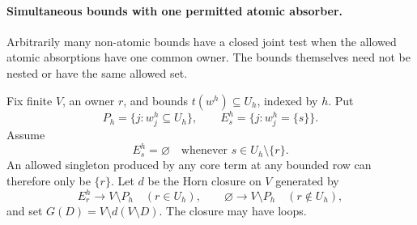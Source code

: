 \paragraph{Simultaneous bounds with one permitted atomic absorber.}
Arbitrarily many non-atomic bounds have a closed joint test when the
allowed atomic absorptions have one common owner. The bounds themselves
need not be nested or have the same allowed set.

Fix finite $V$, an owner $r$, and bounds
$t(w^h)\subseteq U_h$, indexed by $h$. Put
\[
 P_h=\{j:w^h_j\subseteq U_h\},\qquad
 E_s^h=\{j:w^h_j=\{s\}\}.
\]
Assume
\begin{equation}\label{core:eq:single-absorber-budget}
 E_s^h=\varnothing\quad\text{whenever }s\in U_h\setminus\{r\}.
\end{equation}
An allowed singleton produced by any core term at any bounded row
can therefore only be $\{r\}$.
Let $d$ be the Horn closure on $V$ generated by
\[
 E_r^h\longrightarrow V\setminus P_h\quad(r\in U_h),
 \qquad
 \varnothing\longrightarrow V\setminus P_h\quad(r\notin U_h),
\]
and set $G(D)=V\setminus d(V\setminus D)$. The closure may have loops.


